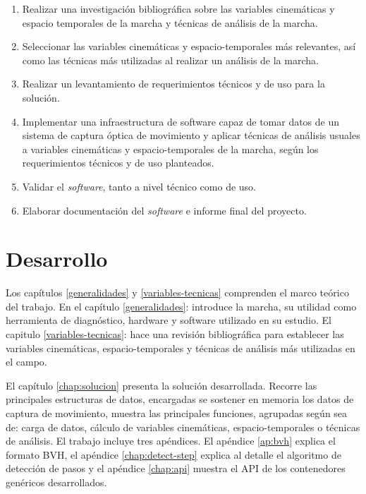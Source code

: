 \begin{enumerate}
    \item Realizar una investigación bibliográfica sobre las variables cinemáticas y espacio temporales de la marcha y técnicas de análisis de la marcha.
    \item Seleccionar las variables cinemáticas y espacio-temporales más relevantes, así como las técnicas más utilizadas al realizar un análisis de la marcha. 
    \item Realizar un levantamiento de requerimientos técnicos y de uso para la solución. 
    \item Implementar una infraestructura de software capaz de tomar datos de un sistema de captura óptica de movimiento y aplicar técnicas de análisis usuales a variables cinemáticas y espacio-temporales de la marcha, según los requerimientos técnicos y de uso planteados.
    \item Validar el \emph{software}, tanto a nivel técnico como de uso.
    \item Elaborar documentación del \emph{software} e informe final del proyecto.
\end{enumerate}

\section{Desarrollo}

Los capítulos \ref{generalidades} y \ref{variables-tecnicas} comprenden el marco teórico del trabajo. En el capítulo \ref{generalidades}:  introduce la marcha, su utilidad como herramienta de diagnóstico, hardware y software utilizado en su estudio. El capitulo \ref{variables-tecnicas}:  hace una revisión bibliográfica para establecer las variables cinemáticas, espacio-temporales y técnicas de análisis más utilizadas en el campo. 

El capítulo \ref{chap:solucion} presenta la solución desarrollada. Recorre las principales estructuras de datos, encargadas se sostener en memoria los datos de captura de movimiento, muestra las principales funciones, agrupadas según sea de: carga de datos, cálculo de variables cinemáticas, espacio-temporales o técnicas de análisis. El trabajo incluye tres apéndices. El apéndice \ref{ap:bvh} explica el formato BVH, el apéndice \ref{chap:detect-step} explica al detalle el algoritmo de detección de pasos y el apéndice \ref{chap:api} muestra el API de los contenedores genéricos desarrollados. 








